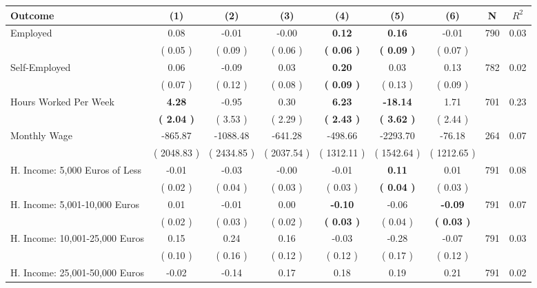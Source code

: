 \begin{tabular}{lcccccccc}
\toprule
 \textbf{Outcome} & \textbf{(1)} & \textbf{(2)} & \textbf{(3)} & \textbf{(4)} & \textbf{(5)} & \textbf{(6)} & \textbf{N} & \textbf{$ R^2$} \\
\midrule
Employed &      0.08 &     -0.01 &     -0.00 & \textbf{     0.12} & \textbf{     0.16} &     -0.01 & 790 &       0.03 \\ 
 & (     0.05 ) & (     0.09 ) & (     0.06 ) & \textbf{(     0.06 )} & \textbf{(     0.09 )} & (     0.07 ) & \\
Self-Employed &      0.06 &     -0.09 &      0.03 & \textbf{     0.20} &      0.03 &      0.13 & 782 &       0.02 \\ 
 & (     0.07 ) & (     0.12 ) & (     0.08 ) & \textbf{(     0.09 )} & (     0.13 ) & (     0.09 ) & \\
Hours Worked Per Week & \textbf{     4.28} &     -0.95 &      0.30 & \textbf{     6.23} & \textbf{   -18.14} &      1.71 & 701 &       0.23 \\ 
 & \textbf{(     2.04 )} & (     3.53 ) & (     2.29 ) & \textbf{(     2.43 )} & \textbf{(     3.62 )} & (     2.44 ) & \\
Monthly Wage &   -865.87 &  -1088.48 &   -641.28 &   -498.66 &  -2293.70 &    -76.18 & 264 &       0.07 \\ 
 & (  2048.83 ) & (  2434.85 ) & (  2037.54 ) & (  1312.11 ) & (  1542.64 ) & (  1212.65 ) & \\
H. Income: 5,000 Euros of Less &     -0.01 &     -0.03 &     -0.00 &     -0.01 & \textbf{     0.11} &      0.01 & 791 &       0.08 \\ 
 & (     0.02 ) & (     0.04 ) & (     0.03 ) & (     0.03 ) & \textbf{(     0.04 )} & (     0.03 ) & \\
H. Income: 5,001-10,000 Euros &      0.01 &     -0.01 &      0.00 & \textbf{    -0.10} &     -0.06 & \textbf{    -0.09} & 791 &       0.07 \\ 
 & (     0.02 ) & (     0.03 ) & (     0.02 ) & \textbf{(     0.03 )} & (     0.04 ) & \textbf{(     0.03 )} & \\
H. Income: 10,001-25,000 Euros &      0.15 &      0.24 &      0.16 &     -0.03 &     -0.28 &     -0.07 & 791 &       0.03 \\ 
 & (     0.10 ) & (     0.16 ) & (     0.12 ) & (     0.12 ) & (     0.17 ) & (     0.12 ) & \\
H. Income: 25,001-50,000 Euros &     -0.02 &     -0.14 &      0.17 &      0.18 &      0.19 &      0.21 & 791 &       0.02 \\ 

\end{tabular}
